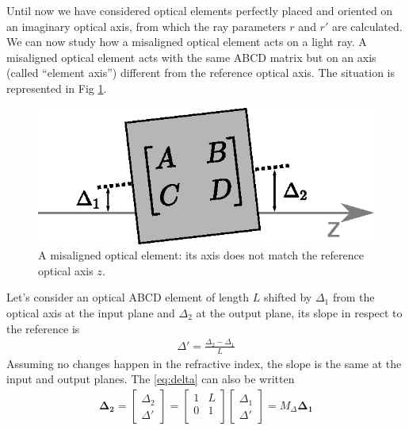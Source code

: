 Until now we have considered optical elements perfectly placed and oriented on an imaginary optical axis, from which the ray parameters $r$ and $r'$ are calculated.
We can now study how a misaligned optical element acts on a light ray. A misaligned optical element acts with the same ABCD matrix but on an axis (called ``element axis'') different from the reference optical axis. The situation is represented in Fig \ref{fig:misaligned}.
\begin{figure}
	\centering
	\includegraphics[width=1\linewidth]{images/misaligned.eps}
	\caption{A misaligned optical element: its axis does not match the reference optical axis $z$.}
	\label{fig:misaligned}
\end{figure}
Let's consider an optical ABCD element of length $L$ shifted by $\Delta_1$ from the optical axis at the input plane and $\Delta_2$ at the output plane, its slope in respect to the reference is 
\begin{align}
\Delta' = \frac{\Delta_2-\Delta_1}{L}
\label{eq:delta}
\end{align}
Assuming no changes happen in the refractive index, the slope is the same at the input and output planes.
The \ref{eq:delta} can also be written
\begin{align}
\boldsymbol{\Delta_2}=
\begin{bmatrix}
\Delta_2 \\
\Delta'
\end{bmatrix}
=
\begin{bmatrix}
1 & L \\
0 & 1 \\
\end{bmatrix}
\begin{bmatrix}
\Delta_1 \\
\Delta'
\end{bmatrix}
=M_\Delta \boldsymbol{\Delta_1}
\end{align}


